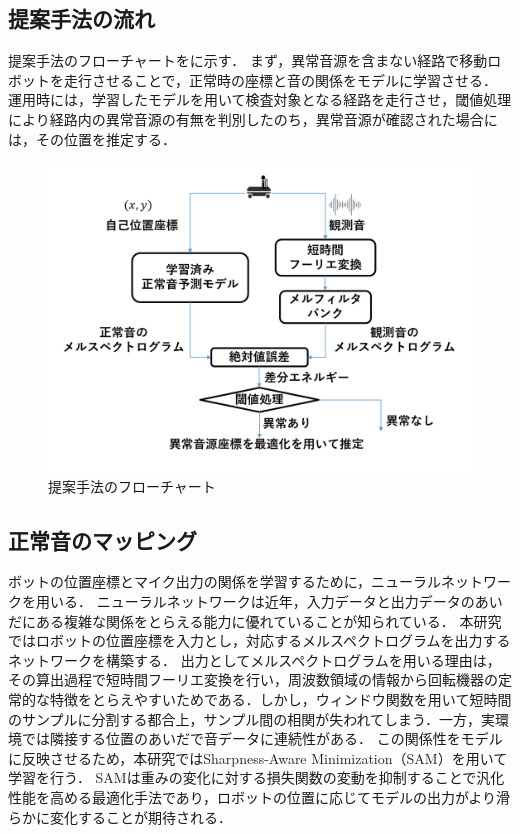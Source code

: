 \documentclass{/workdir/classes/summary}
\begin{document}
\subsection{提案手法の流れ}
提案手法のフローチャートをに示す．
まず，異常音源を含まない経路で移動ロボットを走行させることで，正常時の座標と音の関係をモデルに学習させる．
運用時には，学習したモデルを用いて検査対象となる経路を走行させ，閾値処理により経路内の異常音源の有無を判別したのち，異常音源が確認された場合には，その位置を推定する．
\begin{figure}[t]
  \centering
  \includegraphics[keepaspectratio, width=1.0\linewidth]{flowchart.png}
  \caption{提案手法のフローチャート}
  \label{fig:flowchart}
\end{figure}


\subsection{正常音のマッピング}
ボットの位置座標とマイク出力の関係を学習するために，ニューラルネットワークを用いる．
ニューラルネットワークは近年，入力データと出力データのあいだにある複雑な関係をとらえる能力に優れていることが知られている．
本研究ではロボットの位置座標を入力とし，対応するメルスペクトログラムを出力するネットワークを構築する．
出力としてメルスペクトログラムを用いる理由は，その算出過程で短時間フーリエ変換を行い，周波数領域の情報から回転機器の定常的な特徴をとらえやすいためである．しかし，ウィンドウ関数を用いて短時間のサンプルに分割する都合上，サンプル間の相関が失われてしまう．一方，実環境では隣接する位置のあいだで音データに連続性がある．
この関係性をモデルに反映させるため，本研究ではSharpness-Aware Minimization（SAM）\cite{sam}を用いて学習を行う．
SAMは重みの変化に対する損失関数の変動を抑制することで汎化性能を高める最適化手法であり，ロボットの位置に応じてモデルの出力がより滑らかに変化することが期待される．
\end{document}
